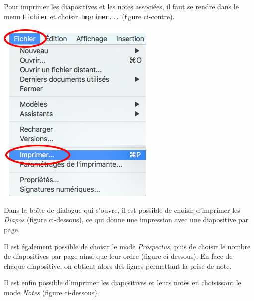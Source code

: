 \begin{minipage}[c]{.58\textwidth}
Pour imprimer les diapositives et les notes associées, il faut se rendre dans le menu \texttt{Fichier} et choisir \texttt{Imprimer...} (figure ci-contre).
\end{minipage}\hfill%
\begin{minipage}[c]{.38\textwidth}
\centering%
\includegraphics[angle=0,width=.7\textwidth]{./images/presentation/Impress1_impression01}
\end{minipage}

\vspace{1em}

Dans la boîte de dialogue qui s'ouvre, il est possible de choisir d'imprimer les \emph{Diapos} (figure ci-dessous), ce qui donne une impression avec une diapositive par page.


Il est également possible de choisir le mode \emph{Prospectus}, puis de choisir le nombre de diapositives par page ainsi que leur ordre (figure ci-dessous). En face de chaque diapositive, on obtient alors des lignes permettant la prise de note.


Il est enfin possible d'imprimer les diapositives et leurs notes en choisissant le mode \emph{Notes} (figure ci-dessous).




